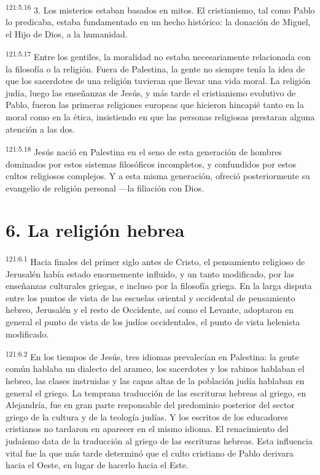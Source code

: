 \par
\textsuperscript{121:5.16} 3. Los misterios estaban basados en mitos. El cristianismo, tal como Pablo lo predicaba, estaba fundamentado en un hecho histórico: la donación de Miguel, el Hijo de Dios, a la humanidad.

\par
\textsuperscript{121:5.17} Entre los gentiles, la moralidad no estaba necesariamente relacionada con la filosofía o la religión. Fuera de Palestina, la gente no siempre tenía la idea de que los sacerdotes de una religión tuvieran que llevar una vida moral. La religión judía, luego las enseñanzas de Jesús, y más tarde el cristianismo evolutivo de Pablo, fueron las primeras religiones europeas que hicieron hincapié tanto en la moral como en la ética, insistiendo en que las personas religiosas prestaran alguna atención a las dos.

\par
\textsuperscript{121:5.18} Jesús nació en Palestina en el seno de esta generación de hombres dominados por estos sistemas filosóficos incompletos, y confundidos por estos cultos religiosos complejos. Y a esta misma generación, ofreció posteriormente su evangelio de religión personal ---la filiación con Dios.

\section*{6. La religión hebrea}
\par
\textsuperscript{121:6.1} Hacia finales del primer siglo antes de Cristo, el pensamiento religioso de Jerusalén había estado enormemente influido, y un tanto modificado, por las enseñanzas culturales griegas, e incluso por la filosofía griega. En la larga disputa entre los puntos de vista de las escuelas oriental y occidental de pensamiento hebreo, Jerusalén y el resto de Occidente, así como el Levante, adoptaron en general el punto de vista de los judíos occidentales, el punto de vista helenista modificado.

\par
\textsuperscript{121:6.2} En los tiempos de Jesús, tres idiomas prevalecían en Palestina: la gente común hablaba un dialecto del arameo, los sacerdotes y los rabinos hablaban el hebreo, las clases instruidas y las capas altas de la población judía hablaban en general el griego. La temprana traducción de las escrituras hebreas al griego, en Alejandría, fue en gran parte responsable del predominio posterior del sector griego de la cultura y de la teología judías. Y los escritos de los educadores cristianos no tardaron en aparecer en el mismo idioma. El renacimiento del judaísmo data de la traducción al griego de las escrituras hebreas. Esta influencia vital fue la que más tarde determinó que el culto cristiano de Pablo derivara hacia el Oeste, en lugar de hacerlo hacia el Este.


